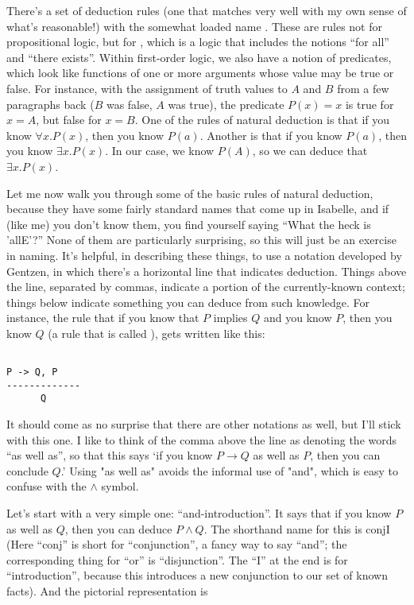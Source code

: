 There's a set of deduction rules (one that matches very well with my own sense of what's reasonable!) with the somewhat loaded name . These are rules not for propositional logic, but for , which is a logic that includes the notions ``for all'' and ``there exists''. Within first-order logic, we also have a notion of predicates, which look like functions of one or more arguments whose value may be true or false. For instance, with the assignment of truth values to $A$ and $B$ from a few paragraphs back ($B$ was false, $A$ was true),  the predicate $P(x) = x$ is true for $x = A$, but false for $x = B$. One of the rules of natural deduction is that if you know $\forall  x . P(x)$, then you know $P(a)$. Another is that if you know $P(a)$, then you know $\exists x . P(x)$. In our case, we know $P(A)$, so we can deduce that $\exists x . P(x)$. 

Let me now walk you through some of the basic rules of natural deduction, because they have some fairly standard names that come up in Isabelle, and if (like me) you don't know them, you find yourself saying ``What the heck is 'allE'?'' None of them are particularly surprising, so this will just be an exercise in naming. It's helpful, in describing these things, to use a notation developed by Gentzen, in which there's a horizontal line that indicates deduction. Things above the line, separated by commas, indicate a portion of the currently-known context; things below indicate something you can deduce from such knowledge. For instance, the rule that if you know that $P$ implies $Q$ and you know $P$, then you know $Q$ (a rule that is called ), gets written like this:

\begin{verbatim}
    
P -> Q, P
-------------
      Q
\end{verbatim}


It should come as no surprise that there are other notations as well, but I'll stick with this one. I like to think of the comma above the line as denoting the words ``as well as'', so that this says `if you know $P \to Q $ as well as $P$, then you can conclude $Q$.' Using "as well as" avoids the informal use of "and", which is easy to confuse with the $\wedge$ symbol.

Let's start with a very simple one: ``and-introduction''. It says that if you know $P$ as well as $Q$, then you can deduce $P \wedge  Q$. The shorthand name for this is conjI (Here ``conj'' is short for ``conjunction'', a fancy way to say ``and''; the corresponding thing for ``or'' is ``disjunction''. The ``I'' at the end is for ``introduction'', because this introduces a new conjunction to our set of known facts). And the pictorial representation is

